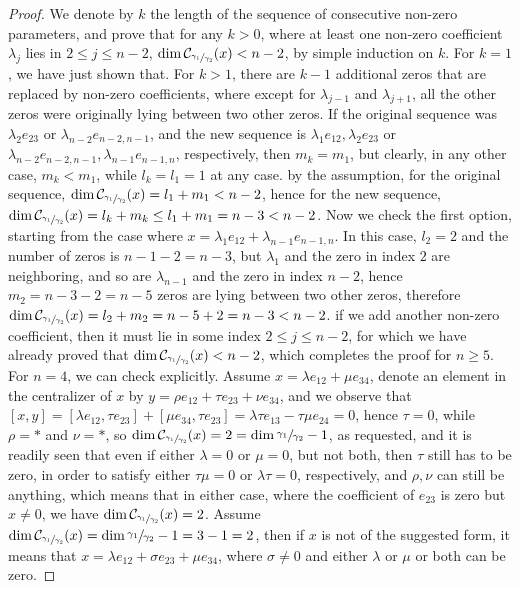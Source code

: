 \documentclass[12pt]{article}
\begin{document}
\begin{proof}
We denote by $k$ the length of the sequence of consecutive non-zero parameters, and prove that for any $k>0$, where at least one non-zero coefficient $\lambda_j$ lies in $2\leq j\leq n-2$, $\dim\mathcal{C}_{\sfrac{\gamma_1}{\gamma_2}}(x)<n-2$, by simple induction on $k$. For $k=1$, we have just shown that. For $k>1$, there are $k-1$ additional zeros that are replaced by non-zero coefficients, where except for $\lambda_{j-1}$ and $\lambda_{j+1}$, all the other zeros were originally lying between two other zeros. If the original sequence was $\lambda_2 e_{23}$ or $\lambda_{n-2}e_{n-2,n-1}$, and the new sequence is $\lambda_1 e_{12},\lambda_2 e_{23}$ or $\lambda_{n-2}e_{n-2,n-1},\lambda_{n-1}e_{n-1,n}$, respectively, then $m_k=m_1$, but clearly, in any other case, $m_k<m_1$, while $l_k=l_1=1$ at any case. by the assumption, for the original sequence, $\dim\mathcal{C}_{\sfrac{\gamma_1}{\gamma_2}}(x)=l_1+m_1<n-2$, hence for the new sequence, $\dim\mathcal{C}_{\sfrac{\gamma_1}{\gamma_2}}(x)=l_k+m_k\leq l_1+m_1=n-3<n-2$. Now we check the first option, starting from the case where $x=\lambda_1 e_{12}+\lambda_{n-1}e_{n-1,n}$. In this case, $l_2=2$ and the number of zeros is $n-1-2=n-3$, but $\lambda_1$ and the zero in index $2$ are neighboring, and so are $\lambda_{n-1}$ and the zero in index $n-2$, hence $m_2=n-3-2=n-5$ zeros are lying between two other zeros, therefore $\dim\mathcal{C}_{\sfrac{\gamma_1}{\gamma_2}}(x)=l_2+m_2=n-5+2=n-3<n-2$. if we add another non-zero coefficient, then it must lie in some index $2\leq j\leq n-2$, for which we have already proved that $\dim\mathcal{C}_{\sfrac{\gamma_1}{\gamma_2}}(x)<n-2$, which completes the proof for $n\geq 5$. For $n=4$, we can check explicitly. Assume $x=\lambda e_{12}+\mu e_{34}$, denote an element in the centralizer of $x$ by $y=\rho e_{12}+\tau e_{23}+\nu e_{34}$, and we observe that $[x,y]=[\lambda e_{12},\tau e_{23}]+[\mu e_{34},\tau e_{23}]=\lambda\tau e_{13}-\tau\mu e_{24}=0$, hence $\tau=0$, while $\rho=*$ and $\nu=*$, so $\dim\mathcal{C}_{\sfrac{\gamma_1}{\gamma_2}}(x)=2=\dim\sfrac{\gamma_1}{\gamma_2}-1$, as requested, and it is readily seen that even if either $\lambda=0$ or $\mu=0$, but not both, then $\tau$ still has to be zero, in order to satisfy either $\tau\mu=0$ or $\lambda\tau=0$, respectively, and $\rho,\nu$ can still be anything, which means that in either case, where the coefficient of $e_{23}$ is zero but $x\neq 0$, we have $\dim\mathcal{C}_{\sfrac{\gamma_1}{\gamma_2}}(x)=2$. Assume $\dim\mathcal{C}_{\sfrac{\gamma_1}{\gamma_2}}(x)=\dim\sfrac{\gamma_1}{\gamma_2}-1=3-1=2$, then if $x$ is not of the suggested form, it means that $x=\lambda e_{12}+\sigma e_{23}+\mu e_{34}$, where $\sigma\neq 0$ and either $\lambda$ or $\mu$ or both can be zero.

\end{proof}
\end{document}
